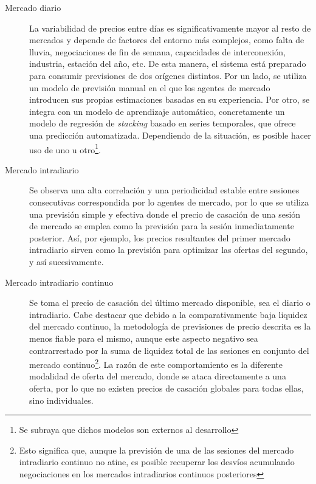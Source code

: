 \begin{description}

  \item[Mercado diario] La variabilidad de precios entre días es significativamente mayor al resto de mercados y depende de factores del entorno más complejos, como falta de lluvia, negociaciones de fin de semana, capacidades de interconexión, industria, estación del año, etc. De esta manera, el sistema está preparado para consumir previsiones de dos orígenes distintos. Por un lado, se utiliza un modelo de previsión manual en el que los agentes de mercado introducen sus propias estimaciones basadas en su experiencia. Por otro, se integra con un modelo de aprendizaje automático, concretamente un modelo de regresión de \textit{stacking} basado en series temporales, que ofrece una predicción automatizada. Dependiendo de la situación, es posible hacer uso de uno u otro\footnote{Se subraya que dichos modelos son externos al desarrollo}.

  \item[Mercado intradiario] Se observa una alta correlación y una periodicidad estable entre sesiones consecutivas correspondida por lo agentes de mercado, por lo que se utiliza una previsión simple y efectiva donde el precio de casación de una sesión de mercado se emplea como la previsión para la sesión inmediatamente posterior. Así, por ejemplo, los precios resultantes del primer mercado intradiario sirven como la previsión para optimizar las ofertas del segundo, y así sucesivamente.

  \item[Mercado intradiario continuo] Se toma el precio de casación del último mercado disponible, sea el diario o intradiario. Cabe destacar que debido a la comparativamente baja liquidez del mercado continuo, la metodología de previsiones de precio descrita es la menos fiable para el mismo, aunque este aspecto negativo sea contrarrestado por la suma de liquidez total de las sesiones en conjunto del mercado continuo\footnote{Esto significa que, aunque la previsión de una de las sesiones del mercado intradiario continuo no atine, es posible recuperar los desvíos acumulando negociaciones en los mercados intradiarios continuos posteriores}. La razón de este comportamiento es la diferente modalidad de oferta del mercado, donde se ataca directamente a una oferta, por lo que no existen precios de casación globales para todas ellas, sino individuales.

\end{description}

